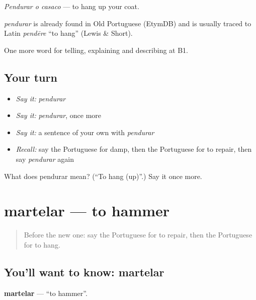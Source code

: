 \emph{Pendurar o casaco} — to hang up your coat.

\begin{cousinweb}
\emph{pendurar} is already found in Old Portuguese (EtymDB) and is usually traced to Latin \emph{pendēre} \textquotedblleft{}to hang\textquotedblright{} (Lewis \& Short).
\end{cousinweb}

\begin{grammarlens}[title={What you've built}]
One more word for telling, explaining and describing at B1.
\end{grammarlens}

\subsection*{Your turn}
\begin{itemize}
\raggedright
  \item \emph{Say it:} \emph{pendurar}
  \item \emph{Say it:} \emph{pendurar}, once more
  \item \emph{Say it:} a sentence of your own with \emph{pendurar}
  \item \emph{Recall:} say the Portuguese for damp, then the Portuguese for to repair, then say \emph{pendurar} again
\end{itemize}

\begin{tcolorbox}[breakable,colback=teal!4,colframe=teal!35!black,title={Before you move on}]
What does pendurar mean? (\textquotedblleft{}To hang (up)\textquotedblright{}.) Say it once more.
\end{tcolorbox}
\section[martelar]{martelar — to hammer}

\label{lesson:PT-C531-martelar}



\begin{quote}
Before the new one: say the Portuguese for to repair, then the Portuguese for to hang.
\end{quote}

\subsection*{You'll want to know: martelar}
\textbf{martelar} — \textquotedblleft{}to hammer\textquotedblright{}.

